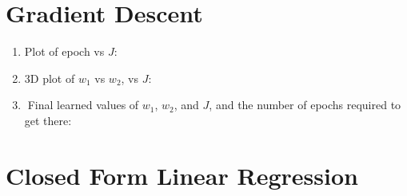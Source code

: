 \documentclass[12pt]{article}
\begin{document}
\begin{enumerate}
\begin{enumerate}
	\end{enumerate}

	
	\begin{comment}

	\end{comment}
	

\end{enumerate}

\newpage

\section{Gradient Descent}

	\begin{enumerate}
		
		\item Plot of epoch vs $J$:\\
		
		
		
		\item 3D plot of $w_1$ vs $w_2$, vs $J$:\\
		
		
		
		\item Final learned values of $w_1$, $w_2$, and $J$, and the number of epochs required to get there:\\
		
		
	\end{enumerate}
	


\section{Closed Form Linear Regression}
\end{document}
